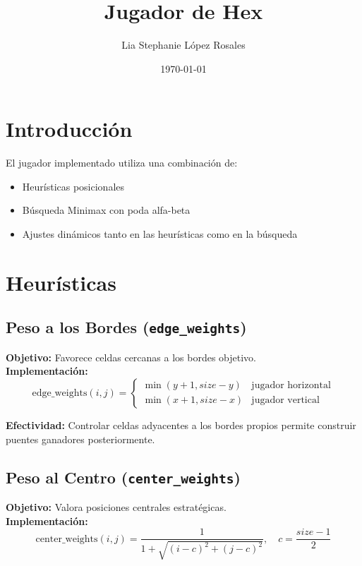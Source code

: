 \documentclass{article}
\title{Jugador de Hex}
\author{Lia Stephanie López Rosales}
\date{\today}
\begin{document}
\maketitle

\section{Introducción}
El jugador implementado utiliza una combinación de:
\begin{itemize}
    \item Heurísticas posicionales
    \item Búsqueda Minimax con poda alfa-beta
    \item Ajustes dinámicos tanto en las heurísticas como en la búsqueda
\end{itemize}

\section{Heurísticas}
\subsection{Peso a los Bordes (\texttt{edge\_weights})}
\textbf{Objetivo:} Favorece celdas cercanas a los bordes objetivo.\\
\textbf{Implementación:}
\begin{equation*}
    \text{edge\_weights}(i,j) = 
    \begin{cases}
        \min(y+1, size-y) & \text{jugador horizontal} \\
        \min(x+1, size-x) & \text{jugador vertical}
    \end{cases}
\end{equation*}

\textbf{Efectividad:} Controlar celdas adyacentes a los bordes propios permite construir puentes ganadores posteriormente.

\subsection{Peso al Centro (\texttt{center\_weights})}
\textbf{Objetivo:} Valora posiciones centrales estratégicas.\\
\textbf{Implementación:}
\begin{equation*}
    \text{center\_weights}(i,j) = \frac{1}{1 + \sqrt{(i-c)^2 + (j-c)^2}},\quad c = \frac{size-1}{2}
\end{equation*}
\end{document}
